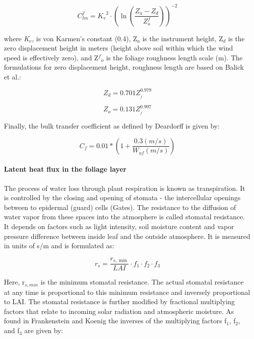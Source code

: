 \begin{equation}
C_{hn}^f = {K_v}^2 \cdot {\left( {\ln \left( {\frac{{{Z_a} - {Z_d}}}{{Z_o^f}}} \right)} \right)^{ - 2}}
\end{equation}

where \emph{K\(_{v}\),} is von Karmen's constant (0.4), Z\(_{a}\) is the instrument height, Z\(_{d}\) is the zero displacement height in meters (height above soil within which the wind speed is effectively zero), and Z\(^{f}\)\(_{o}\) is the foliage roughness length scale (m). The formulations for zero displacement height, roughness length are based on Balick et al.:

\begin{equation}
{Z_d} = 0.701Z_{_f}^{0.979}
\end{equation}

\begin{equation}
{Z_o} = 0.131Z_{_f}^{0.997}
\end{equation}

Finally, the bulk transfer coefficient as defined by Deardorff is given by:

\begin{equation}
{C_f} = 0.01*\left( {1 + \frac{{0.3(m/s)}}{{{W_{af}}(m/s)}}} \right)
\end{equation}

\paragraph{Latent heat flux in the foliage layer}\label{latent-heat-flux-in-the-foliage-layer}

The process of water loss through plant respiration is known as transpiration. It is controlled by the closing and opening of stomata - the intercellular openings between to epidermal (guard) cells (Gates). The resistance to the diffusion of water vapor from these spaces into the atmosphere is called stomatal resistance. It depends on factors such as light intensity, soil moisture content and vapor pressure difference between inside leaf and the outside atmosphere. It is measured in units of s/m and is formulated as:

\begin{equation}
{r_s} = \frac{{{r_{s,\min }}}}{{LAI}} \cdot {f_1} \cdot {f_2} \cdot {f_3}
\end{equation}

Here, r\(_{s,min}\) is the minimum stomatal resistance. The actual stomatal resistance at any time is proportional to this minimum resistance and inversely proportional to LAI. The stomatal resistance is further modified by fractional multiplying factors that relate to incoming solar radiation and atmospheric moisture. As found in Frankenstein and Koenig the inverses of the multiplying factors f\(_{1}\), f\(_{2}\), and f\(_{3}\) are given by:

